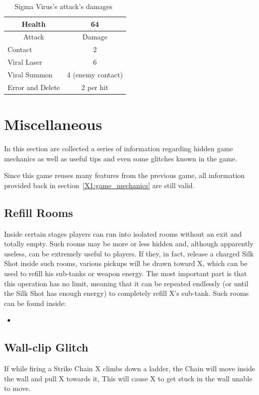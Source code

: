 \begin{table}[htp]
	\centering
	\begin{tabular}[h]{l c}
		\toprule
		\multicolumn{1}{c}{Health}  & 64\\
		\midrule
		\multicolumn{1}{c}{Attack} & \multicolumn{1}{c}{Damage}\\
		Contact & 2 \\
		Viral Laser & 6\\
		Viral Summon & 4 (enemy contact)\\
		Error and Delete & 2 per hit\\
		\bottomrule
	\end{tabular}
	\caption{Sigma Virus's attack's damages~\cite{wiki:Neo_sigma}}
\end{table}

\section{Miscellaneous}\label{X2:misc} %
In this section are collected a series of information regarding hidden game mechanics as well as useful tips and even some glitches known in the game. 

Since this game reuses many features from the previous game, all information provided back in section~\ref{X1:game_mechanics} are still valid.

\subsection{Refill Rooms}
Inside certain stages players can run into isolated rooms without an exit and totally empty. Such rooms may be more or less hidden and, although apparently useless, can be extremely useful to players. If they, in fact, release a charged Silk Shot inside such rooms, various pickups will be drawn toward X, which can be used to refill his sub-tanks or weapon energy. The most important part is that this operation has no limit, meaning that it can be repeated endlessly (or until the Silk Shot has enough energy) to completely refill X's sub-tank. Such rooms can be found inside:
\begin{itemize}
	\item
\end{itemize}

\subsection{Wall-clip Glitch}
If while firing a Strike Chain X climbs down a ladder, the Chain will move inside the wall and pull X towards it, This will cause X to get stuck in the wall unable to move.

